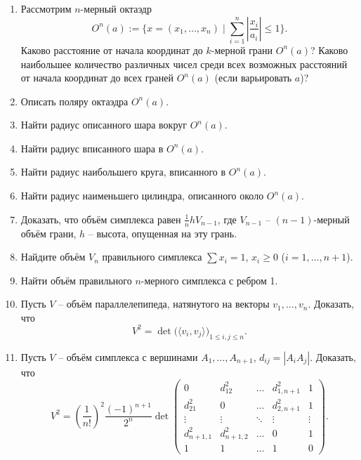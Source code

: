 \begin{enumerate}
		\item Рассмотрим $n$-мерный октаэдр 
		\[
			O^n(a) := \{ x = (x_1,\dots,x_n) \mid \sum_{i=1}^n \left| \frac{x_i}{a_i} \right| \le 1 \}.
		\]
		Каково расстояние от начала координат до $k$-мерной грани $O^n(a)$?  
		Каково наибольшее количество различных чисел среди всех возможных расстояний 
		от начала координат до всех граней $O^n(a)$ (если варьировать $a$)?

		\item Описать поляру октаэдра $O^n(a)$.

		\item Найти радиус описанного шара вокруг $O^n(a)$.

		\item Найти радиус вписанного шара в $O^n(a)$.

		\item Найти радиус наибольшего круга, вписанного в $O^n(a)$.

		\item Найти радиус наименьшего цилиндра, описанного около $O^n(a)$.

		\item Доказать, что объём симплекса равен $\frac{1}{n} h V_{n-1}$, где $V_{n-1}$ -- $(n-1)$-мерный объём грани, $h$ -- высота, опущенная на эту грань.

		\item Найдите объём $V_n$ правильного симплекса $\sum x_i = 1$, $x_i \ge 0$ ($i=1,\dots,n+1$).

		\item Найти объём правильного $n$-мерного симплекса с ребром 1.

		\item Пусть $V$ -- объём параллелепипеда, натянутого на векторы $v_1,\dots,v_n$. Доказать, что 
		\[
			V^2 = \det \bigl( \langle v_i, v_j \rangle \bigr)_{1\le i,j\le n}.
		\]

		\item Пусть $V$ -- объём симплекса с вершинами $A_1,\dots,A_{n+1}$, $d_{ij} = |A_i A_j|$. Доказать, что 
		\[
			V^2 = \left(\frac{1}{n!}\right)^2 \frac{(-1)^{n+1}}{2^n} \det \begin{pmatrix}
				0 & d_{12}^2 & \dots & d_{1,n+1}^2 & 1 \\
				d_{21}^2 & 0 & \dots & d_{2,n+1}^2 & 1 \\
				\vdots & \vdots & \ddots & \vdots & \vdots \\
				d_{n+1,1}^2 & d_{n+1,2}^2 & \dots & 0 & 1 \\
				1 & 1 & \dots & 1 & 0
			\end{pmatrix}.
		\]


\end{enumerate}
